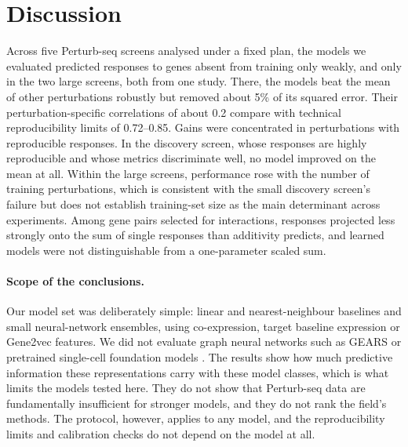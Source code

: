 \section{Discussion}
Across five Perturb-seq screens analysed under a fixed plan, the models we evaluated predicted responses to genes absent from training only weakly, and only in the two large screens, both from one study. There, the models beat the mean of other perturbations robustly but removed about 5\% of its squared error. Their perturbation-specific correlations of about 0.2 compare with technical reproducibility limits of 0.72--0.85. Gains were concentrated in perturbations with reproducible responses. In the discovery screen, whose responses are highly reproducible and whose metrics discriminate well, no model improved on the mean at all. Within the large screens, performance rose with the number of training perturbations, which is consistent with the small discovery screen's failure but does not establish training-set size as the main determinant across experiments. Among gene pairs selected for interactions, responses projected less strongly onto the sum of single responses than additivity predicts, and learned models were not distinguishable from a one-parameter scaled sum.

\paragraph{Scope of the conclusions.} Our model set was deliberately simple: linear and nearest-neighbour baselines and small neural-network ensembles, using co-expression, target baseline expression or Gene2vec features. We did not evaluate graph neural networks such as GEARS \citep{roohani2024} or pretrained single-cell foundation models \citep{cui2024}. The results show how much predictive information these representations carry with these model classes, which is what limits the models tested here. They do not show that Perturb-seq data are fundamentally insufficient for stronger models, and they do not rank the field's methods. The protocol, however, applies to any model, and the reproducibility limits and calibration checks do not depend on the model at all.

